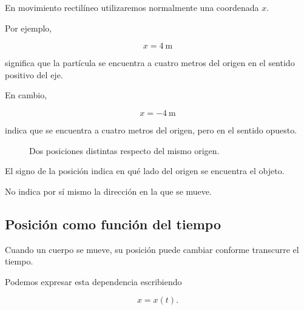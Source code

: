En movimiento rectilíneo utilizaremos normalmente una coordenada \(x\).

Por ejemplo,

\[ x=\SI{4}{\meter} \]

significa que la partícula se encuentra a cuatro metros del origen en el
sentido positivo del eje.

En cambio,

\[ x=-\SI{4}{\meter} \]

indica que se encuentra a cuatro metros del origen, pero en el sentido
opuesto.

\begin{figure}[H]
    \centering


    \caption{Dos posiciones distintas respecto del mismo origen.}
\end{figure}

\begin{idea}
El signo de la posición indica en qué lado del origen se encuentra el
objeto.

No indica por sí mismo la dirección en la que se mueve.
\end{idea}


\subsection{Posición como función del tiempo}

Cuando un cuerpo se mueve, su posición puede cambiar conforme transcurre el
tiempo.

Podemos expresar esta dependencia escribiendo

\[ x=x(t). \]


